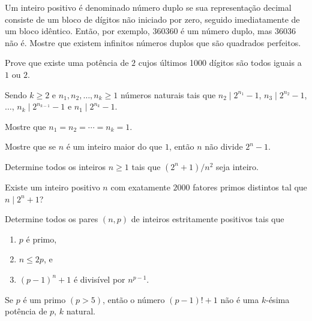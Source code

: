 \documentclass[10pt,a4paper]{article}
\begin{document}
	\begin{prob}
		Um inteiro positivo é denominado número duplo se sua representação decimal consiste de um bloco de dígitos não iniciado por zero, seguido imediatamente de um bloco idêntico. Então, por exemplo, $360360$ é um número duplo, mas $36036$ não é. Mostre que existem infinitos números duplos que são quadrados perfeitos.
	\end{prob}

	\begin{prob}
		Prove que existe uma potência de $2$ cujos últimos 1000 dígitos são todos iguais a $1$ ou $2$.
	\end{prob}

	\begin{prob}
		Sendo $k\geq2$ e $n_1, n_2, \ldots, n_k\geq1$ números naturais tais que $n_2 \mid 2^{n_1}-1$, $n_3 \mid 2^{n_2}-1$, $\dots$, $n_k \mid 2^{n_{k-1}}-1$ e $n_1 \mid 2^{n_k}-1$.

		Mostre que $n_1=n_2=\cdots=n_k=1$.
	\end{prob}

	\begin{prob}
		Mostre que se $n$ é um inteiro maior do que $1$, então $n$ não divide $2^n-1$.
	\end{prob}

	\begin{prob}
		Determine todos os inteiros $n\geq1$ tais que $({2^n+1})/n^2$ seja inteiro.
	\end{prob}

	\begin{prob}
		Existe um inteiro positivo $n$ com exatamente $2000$ fatores primos distintos tal que $n \mid 2^n+1$?
	\end{prob}

	\begin{prob}
		Determine todos os pares $(n,p)$ de inteiros estritamente positivos tais que
		\begin{enumerate}[label = (\textit{\roman*})]
			\item $p$ é primo,
			\item $n\leq 2p$, e
			\item $(p-1)^n+1$ é divisível por $n^{p-1}$.
		\end{enumerate}
	\end{prob}

	\begin{prob} Se $p$ é um primo $(p>5)$, então o número $(p-1)!+1$ não é uma
	$k$-ésima potência de $p$, $k$ natural.
	\end{prob}
\end{document}
